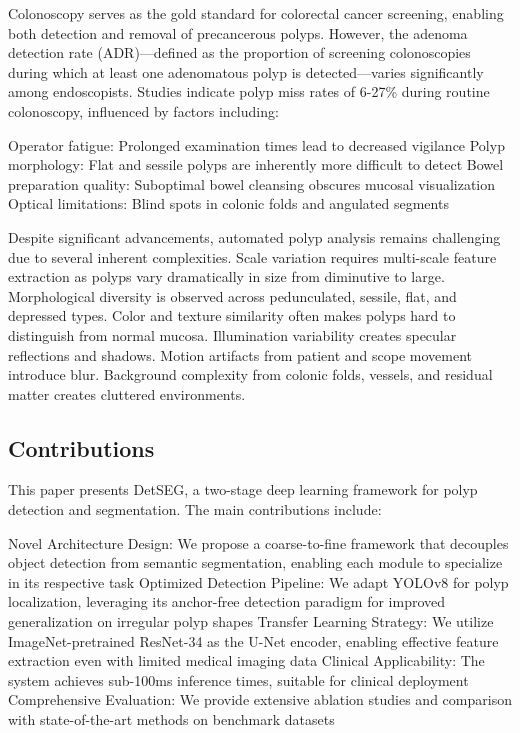 \documentclass[11pt,a4paper]{article}
\begin{document}
Colonoscopy serves as the gold standard for colorectal cancer screening, enabling both detection and removal of precancerous polyps. However, the adenoma detection rate (ADR)---defined as the proportion of screening colonoscopies during which at least one adenomatous polyp is detected---varies significantly among endoscopists. Studies indicate polyp miss rates of 6-27\% during routine colonoscopy, influenced by factors including:

Operator fatigue: Prolonged examination times lead to decreased vigilance
Polyp morphology: Flat and sessile polyps are inherently more difficult to detect
Bowel preparation quality: Suboptimal bowel cleansing obscures mucosal visualization
Optical limitations: Blind spots in colonic folds and angulated segments

Despite significant advancements, automated polyp analysis remains challenging due to several inherent complexities. Scale variation requires multi-scale feature extraction as polyps vary dramatically in size from diminutive to large. Morphological diversity is observed across pedunculated, sessile, flat, and depressed types. Color and texture similarity often makes polyps hard to distinguish from normal mucosa. Illumination variability creates specular reflections and shadows. Motion artifacts from patient and scope movement introduce blur. Background complexity from colonic folds, vessels, and residual matter creates cluttered environments.

\subsection{Contributions}
This paper presents DetSEG, a two-stage deep learning framework for polyp detection and segmentation. The main contributions include:

Novel Architecture Design: We propose a coarse-to-fine framework that decouples object detection from semantic segmentation, enabling each module to specialize in its respective task
Optimized Detection Pipeline: We adapt YOLOv8 for polyp localization, leveraging its anchor-free detection paradigm for improved generalization on irregular polyp shapes
Transfer Learning Strategy: We utilize ImageNet-pretrained ResNet-34 as the U-Net encoder, enabling effective feature extraction even with limited medical imaging data
Clinical Applicability: The system achieves sub-100ms inference times, suitable for clinical deployment
Comprehensive Evaluation: We provide extensive ablation studies and comparison with state-of-the-art methods on benchmark datasets
\end{document}
